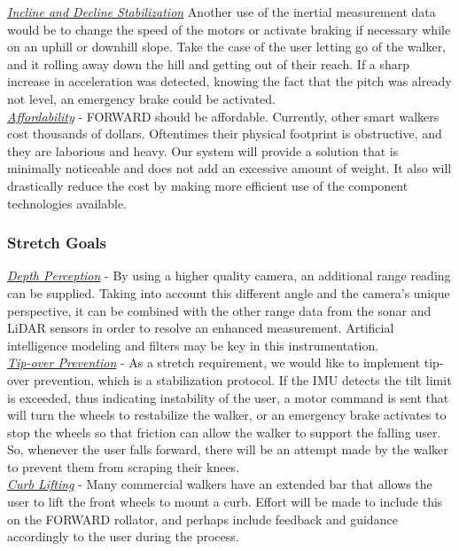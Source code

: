 \noindent \underline{\textit{Incline and Decline Stabilization}}
Another use of the inertial measurement data would be to change the speed of the motors or activate braking if necessary while on an uphill or downhill slope. Take the case of the user letting go of the walker, and it rolling away down the hill and getting out of their reach. If a sharp increase in acceleration was detected, knowing the fact that the pitch was already not level, an emergency brake could be activated.\\

\noindent \underline{\textit{Affordability}} - FORWARD should be affordable. Currently, other smart walkers cost thousands of dollars. Oftentimes their physical footprint is obstructive, and they are laborious and heavy. Our system will provide a solution that is minimally noticeable and does not add an excessive amount of weight. It also will drastically reduce the cost by making more efficient use of the component technologies available.
\subsubsection{Stretch Goals}
\noindent \underline{\textit{Depth Perception}} - By using a higher quality camera, an additional range reading can be supplied. Taking into account this different angle and the camera’s unique perspective, it can be combined with the other range data from the sonar and LiDAR sensors in order to resolve an enhanced measurement. Artificial intelligence modeling and filters may be key in this instrumentation. \\

\noindent \underline{\textit{Tip-over Prevention}} - As a stretch requirement, we would like to implement tip-over prevention, which is a stabilization protocol. If the IMU detects the tilt limit is exceeded, thus indicating instability of the user, a motor command is sent that will turn the wheels to restabilize the walker, or an emergency brake activates to stop the wheels so that friction can allow the walker to support the falling user. So, whenever the user falls forward, there will be an attempt made by the walker to prevent them from scraping their knees. \\

\noindent \underline{\textit{Curb Lifting}} - Many commercial walkers have an extended bar that allows the user to lift the front wheels to mount a curb. Effort will be made to include this on the FORWARD rollator, and perhaps include feedback and guidance accordingly to the user during the process.